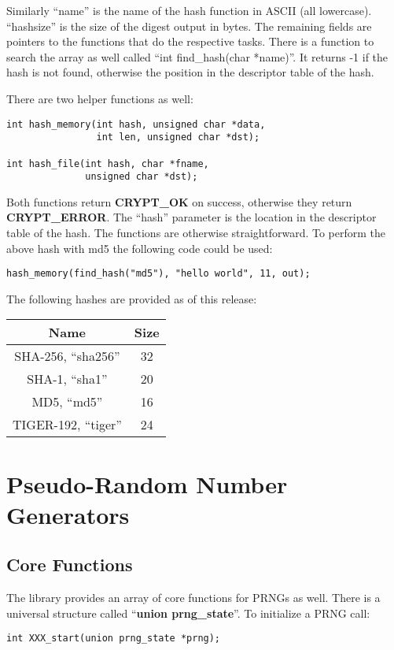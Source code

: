 \documentclass{book}
\begin{document}
Similarly ``name'' is the name of the hash function in ASCII (all lowercase).  ``hashsize'' is the size of the digest output
in bytes.  The remaining fields are pointers to the functions that do the respective tasks.  There is a function to
search the array as well called ``int find\_hash(char *name)''.  It returns -1 if the hash is not found, otherwise the
position in the descriptor table of the hash.

There are two helper functions as well:
\begin{verbatim}
int hash_memory(int hash, unsigned char *data, 
                int len, unsigned char *dst);

int hash_file(int hash, char *fname, 
              unsigned char *dst);
\end{verbatim}

Both functions return {\bf CRYPT\_OK} on success, otherwise they return {\bf CRYPT\_ERROR}.  The ``hash'' parameter is
the location in the descriptor table of the hash.  The functions are otherwise straightforward.  To perform the above 
hash with md5 the following code could be used:
\begin{verbatim}
hash_memory(find_hash("md5"), "hello world", 11, out);
\end{verbatim}

The following hashes are provided as of this release:
\begin{center}
\begin{tabular}{|c|c|}
      \hline Name & Size \\
      \hline SHA-256, ``sha256'' & 32 \\
      \hline SHA-1, ``sha1'' & 20 \\
      \hline MD5, ``md5'' & 16 \\
      \hline TIGER-192, ``tiger'' & 24 \\
      \hline
\end{tabular}
\end{center}

\chapter{Pseudo-Random Number Generators}
\section{Core Functions}

The library provides an array of core functions for PRNGs as well.  There is a universal structure called 
``{\bf union prng\_state}''.  To initialize a PRNG call:
\begin{verbatim}
int XXX_start(union prng_state *prng);
\end{verbatim}
\end{document}
